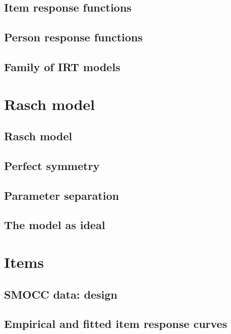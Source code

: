 \documentclass[]{book}
\begin{document}
\section{Item response functions}\label{item-response-functions}

\section{Person response functions}\label{person-response-functions}

\section{Family of IRT models}\label{family-of-irt-models}

\chapter{Rasch model}\label{rasch}

\section{Rasch model}\label{rasch-model}

\section{Perfect symmetry}\label{perfect-symmetry}

\section{Parameter separation}\label{parameter-separation}

\section{The model as ideal}\label{the-model-as-ideal}

\chapter{Items}\label{items}

\section{SMOCC data: design}\label{smocc-data-design}

\section{Empirical and fitted item response
curves}\label{empirical-and-fitted-item-response-curves}
\end{document}
